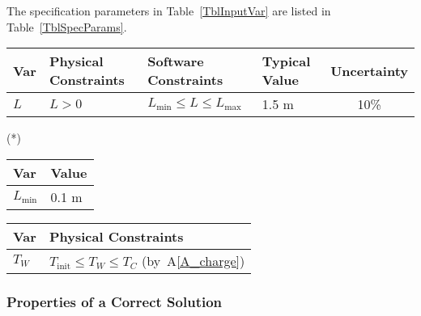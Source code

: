\documentclass[12pt]{article}
\newcommand{\aref}[1]{A\ref{#1}}
\begin{document}
The specification parameters in Table~\ref{TblInputVar} are listed in
Table~\ref{TblSpecParams}.

\begin{table}[!h]
	  \caption{Input Variables} \label{TblInputVar}
	  \renewcommand{\arraystretch}{1.2}
	\noindent \begin{longtable*}{l l l l c} 
		  \toprule
		  \textbf{Var} & \textbf{Physical Constraints} & \textbf{Software Constraints} &
		                             \textbf{Typical Value} & \textbf{Uncertainty}\\
		  \midrule 
		  $L$ & $L > 0$ & $L_{\text{min}} \leq L \leq L_{\text{max}}$ & 1.5 \si[per-mode=symbol] {\metre} & 10\%
		  \\
		  \bottomrule
	\end{longtable*}
\end{table}

\noindent 
\begin{description}
\item[(*)] 
\end{description}

\begin{table}[!h]
\caption{Specification Parameter Values} \label{TblSpecParams}
\renewcommand{\arraystretch}{1.2}
\noindent \begin{longtable*}{l l} 
  \toprule
  \textbf{Var} & \textbf{Value} \\
  \midrule 
  $L_\text{min}$ & 0.1 \si{\metre}\\
  \bottomrule
\end{longtable*}
\end{table}

\begin{table}[!h]
\caption{Output Variables} \label{TblOutputVar}
\renewcommand{\arraystretch}{1.2}
\noindent \begin{longtable*}{l l} 
  \toprule
  \textbf{Var} & \textbf{Physical Constraints} \\
  \midrule 
  $T_W$ & $T_\text{init} \leq T_W \leq T_C$ (by~\aref{A_charge})
  \\
  \bottomrule
\end{longtable*}
\end{table}

\subsubsection{Properties of a Correct Solution} \label{sec_CorrectSolution}
\end{document}
